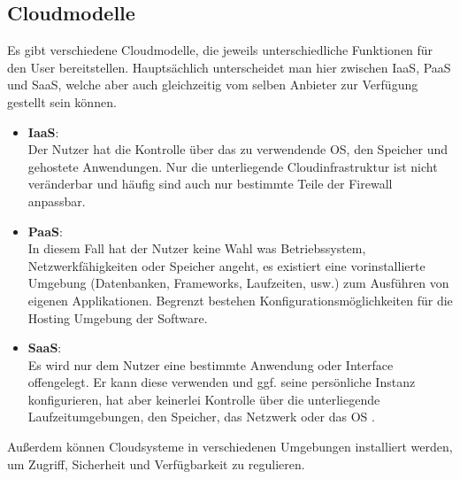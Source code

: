 \subsection{Cloudmodelle}

Es gibt verschiedene Cloudmodelle, die jeweils unterschiedliche Funktionen für den User bereitstellen. Hauptsächlich unterscheidet man hier zwischen \ac{IaaS}, \ac{PaaS} und \ac{SaaS}, welche aber auch gleichzeitig vom selben Anbieter zur Verfügung gestellt sein können.

\begin{itemize}
	\item \textbf{IaaS}:\\
	Der Nutzer hat die Kontrolle über das zu verwendende OS, den Speicher und gehostete Anwendungen. Nur die unterliegende Cloudinfrastruktur ist nicht veränderbar und häufig sind auch nur bestimmte Teile der Firewall anpassbar.
	\item \textbf{PaaS}:\\
	In diesem Fall hat der Nutzer keine Wahl was Betriebssystem, Netzwerkfähigkeiten oder Speicher angeht, es existiert eine vorinstallierte Umgebung (Datenbanken, Frameworks, Laufzeiten, usw.) zum Ausführen von eigenen Applikationen. Begrenzt bestehen Konfigurationsmöglichkeiten für die Hosting Umgebung der Software. 
	\item \textbf{SaaS}:\\
	Es wird nur dem Nutzer eine bestimmte Anwendung oder Interface offengelegt. Er kann diese verwenden und ggf. seine persönliche Instanz konfigurieren, hat aber keinerlei Kontrolle über die unterliegende Laufzeitumgebungen, den Speicher, das Netzwerk oder das \acs{OS} \parencite[S. 15f]{rafaels.2015}.
\end{itemize}

Außerdem können Cloudsysteme in verschiedenen Umgebungen installiert werden, um Zugriff, Sicherheit und Verfügbarkeit zu regulieren.

